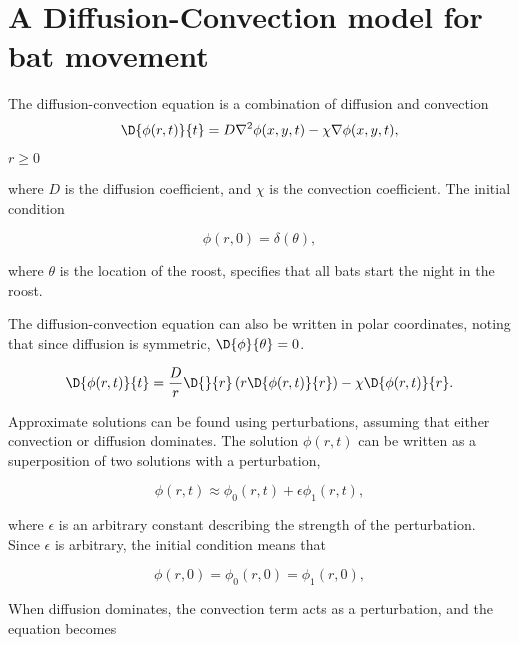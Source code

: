 
\section{A Diffusion-Convection model for bat movement}


The diffusion-convection equation is a combination of diffusion and convection
\begin{equation}
  \D{\phi(r,t)}{t} = D\nabla^2\phi(x,y,t) - \chi \nabla\phi(x,y,t),
\end{equation}

$r \geq 0$

where $D$ is the diffusion coefficient, and $\chi$ is the convection coefficient. The initial condition

\begin{equation}
  \phi(r,0) = \delta(\theta),
\end{equation}

where $\theta$ is the location of the roost, specifies that all bats start the night in the roost.

The diffusion-convection equation can also be written in polar coordinates, noting that since diffusion is symmetric,  $\D{\phi}{\theta} = 0$.

\begin{equation}
  \D{\phi(r,t)}{t} = \frac{D}{r} \D{}{r}\left(r \D{\phi(r,t)}{r} \right) - \chi \D{\phi(r,t)}{r}.
\end{equation}

Approximate solutions can be found using perturbations, assuming that either convection or diffusion dominates. The solution $\phi(r,t)$ can be written as a superposition of two solutions with a perturbation,

\begin{equation}
  \phi(r,t) \approx \phi_0(r,t) + \epsilon \phi_1(r,t),
  \label{eqn:phi_perturbation}
\end{equation}

where $\epsilon$ is an arbitrary constant describing the strength of the perturbation. Since $\epsilon$ is arbitrary, the initial condition means that

\begin{equation}
  \phi(r,0) = \phi_0(r,0) = \phi_1(r,0),
\end{equation}

When diffusion dominates, the convection term acts as a perturbation, and the equation becomes

